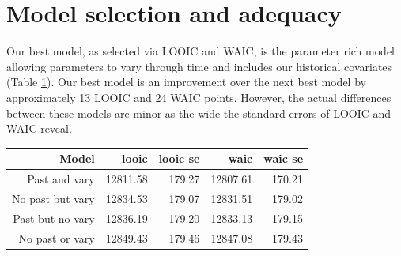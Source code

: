 \documentclass[12pt,letterpaper]{article}
\begin{document}
\section{Model selection and adequacy}

Our best model, as selected via LOOIC and WAIC, is the parameter rich model allowing parameters to vary through time and includes our historical covariates (Table \ref{tab:selection}). Our best model is an improvement over the next best model by approximately 13 LOOIC and 24 WAIC points. However, the actual differences between these models are minor as the wide the standard errors of LOOIC and WAIC reveal. 
\begin{table}[ht]
  \centering
  \begin{tabular}{ r r r r r }
    \hline
    Model & looic & looic se & waic & waic se \\
    \hline
    Past and vary & 12811.58 & 179.27 & 12807.61 & 170.21 \\
    No past but vary & 12834.53 & 179.07 & 12831.51 & 179.02 \\
    Past but no vary & 12836.19 & 179.20 & 12833.13 & 179.15 \\
    No past or vary & 12849.43 & 179.46 & 12847.08 & 179.43 \\
    \hline
  \end{tabular}
  \label{tab:selection}
\end{table}
\end{document}
